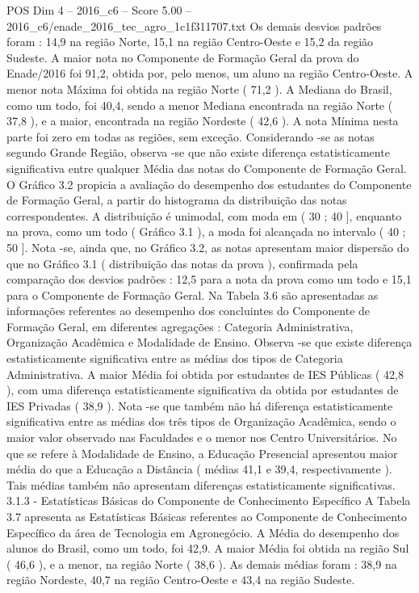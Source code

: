 \begin{textsample}{POS Dim 4 – 2016\_c6 – Score 5.00 – 2016\_c6/enade\_2016\_tec\_agro\_1c1f311707.txt}
Os demais desvios padrões foram : 14,9 na região Norte, 15,1 na região Centro-Oeste e 15,2 da região Sudeste.
A maior nota no Componente de Formação Geral da prova do Enade/2016 foi 91,2, obtida por, pelo menos, um aluno na região Centro-Oeste.
A menor nota Máxima foi obtida na região Norte ( 71,2 ).
A Mediana do Brasil, como um todo, foi 40,4, sendo a menor Mediana encontrada na região Norte ( 37,8 ), e a maior, encontrada na região Nordeste ( 42,6 ).
A nota Mínima nesta parte foi zero em todas as regiões, sem exceção.
Considerando -se as notas segundo Grande Região, observa -se que não existe diferença estatisticamente significativa entre qualquer Média das notas do Componente de Formação Geral.
O Gráfico 3.2 propicia a avaliação do desempenho dos estudantes do Componente de Formação Geral, a partir do histograma da distribuição das notas correspondentes.
A distribuição é unimodal, com moda em ( 30 ; 40 ], enquanto na prova, como um todo ( Gráfico 3.1 ), a moda foi alcançada no intervalo ( 40 ; 50 ].
Nota -se, ainda que, no Gráfico 3.2, as notas apresentam maior dispersão do que no Gráfico 3.1 ( distribuição das notas da prova ), confirmada pela comparação dos desvios padrões : 12,5 para a nota da prova como um todo e 15,1 para o Componente de Formação Geral.
Na Tabela 3.6 são apresentadas as informações referentes ao desempenho dos concluintes do Componente de Formação Geral, em diferentes agregações : Categoria Administrativa, Organização Acadêmica e Modalidade de Ensino.
Observa -se que existe diferença estatisticamente significativa entre as médias dos tipos de Categoria Administrativa.
A maior Média foi obtida por estudantes de IES Públicas ( 42,8 ), com uma diferença estatisticamente significativa da obtida por estudantes de IES Privadas ( 38,9 ).
Nota -se que também não há diferença estatisticamente significativa entre as médias dos três tipos de Organização Acadêmica, sendo o maior valor observado nas Faculdades e o menor nos Centro Universitários.
No que se refere à Modalidade de Ensino, a Educação Presencial apresentou maior média do que a Educação a Distância ( médias 41,1 e 39,4, respectivamente ).
Tais médias também não apresentam diferenças estatisticamente significativas. 3.1.3 - Estatísticas Básicas do Componente de Conhecimento Específico A Tabela 3.7 apresenta as Estatísticas Básicas referentes ao Componente de Conhecimento Específico da área de Tecnologia em Agronegócio.
A Média do desempenho dos alunos do Brasil, como um todo, foi 42,9.
A maior Média foi obtida na região Sul ( 46,6 ), e a menor, na região Norte ( 38,6 ).
As demais médias foram : 38,9 na região Nordeste, 40,7 na região Centro-Oeste e 43,4 na região Sudeste.

\end{textsample}
